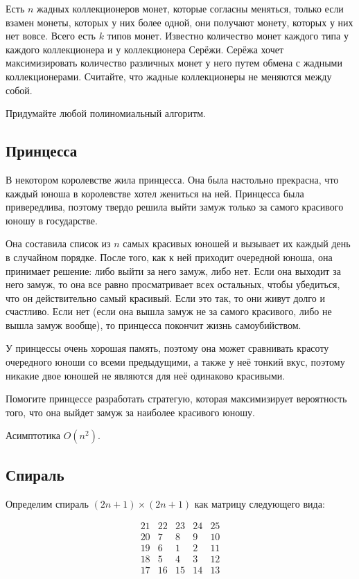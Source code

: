 \documentclass[11pt]{article}
\begin{document}
Есть \(n\) жадных коллекционеров монет, которые согласны меняться,
только если взамен монеты, которых у них более одной, они получают
монету, которых у них нет вовсе. Всего есть \(k\) типов монет. Известно
количество монет каждого типа у каждого коллекционера и у коллекционера
Серёжи. Серёжа хочет максимизировать количество различных монет у него
путем обмена с жадными коллекционерами. Считайте, что жадные
коллекционеры не меняются между собой.

Придумайте любой полиномиальный алгоритм.

    \subsection{Принцесса}\label{ux43fux440ux438ux43dux446ux435ux441ux441ux430}

В некотором королевстве жила принцесса. Она была настольно прекрасна,
что каждый юноша в королевстве хотел жениться на ней. Принцесса была
привередлива, поэтому твердо решила выйти замуж только за самого
красивого юношу в государстве.

Она составила список из \(n\) самых красивых юношей и вызывает их каждый
день в случайном порядке. После того, как к ней приходит очередной
юноша, она принимает решение: либо выйти за него замуж, либо нет. Если
она выходит за него замуж, то она все равно просматривает всех
остальных, чтобы убедиться, что он действительно самый красивый. Если
это так, то они живут долго и счастливо. Если нет (если она вышла замуж
не за самого красивого, либо не вышла замуж вообще), то принцесса
покончит жизнь самоубийством.

У принцессы очень хорошая память, поэтому она может сравнивать красоту
очередного юноши со всеми предыдущими, а также у неё тонкий вкус,
поэтому никакие двое юношей не являются для неё одинаково красивыми.

Помогите принцессе разработать стратегую, которая максимизирует
вероятность того, что она выйдет замуж за наиболее красивого юношу.

Асимптотика \(O(n^2)\).

    \subsection{Спираль}\label{ux441ux43fux438ux440ux430ux43bux44c}

Определим спираль \((2n+1) \times (2n+1)\) как матрицу следующего вида:

\[
\begin{matrix}
21 & 22 & 23 & 24 & 25 \\
20 & 7 &  8 &  9 & 10 \\
19 & 6 &  1 &  2 & 11 \\
18 & 5 &  4 &  3 & 12 \\
17 & 16 & 15 & 14 & 13 \\
\end{matrix}
\]
\end{document}
